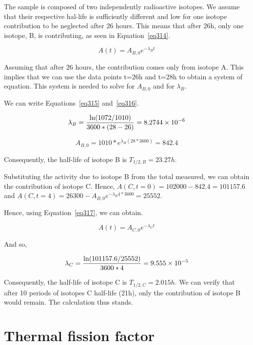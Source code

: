 The sample is composed of two independently radioactive isotopes. We assume that their respective hal-life is sufficiently different and low for one isotope contribution to be neglected after 26 hours. This means that after 26h, only one isotope, B, is contributing, as seen in Equation~\ref{eq314}.

\begin{equation}\label{eq314}
A(t) = A_{B, 0}e^{-\lambda_B t}
\end{equation}

Assuming that after 26 hours, the contribution comes only from isotope A. This implies that we can use the data points t=26h and t=28h to obtain a system of equation. This system is needed to solve for $A_{B, 0}$ and for $\lambda_B$.

We can write Equations~\ref{eq315} and~\ref{eq316}.


\begin{equation}\label{eq315}
\lambda_B = \frac{\ln(1072/1010)}{3600 * (28-26)} = \text{\num{8.2744e-6}}
\end{equation}

\begin{equation}\label{eq316}
A_{B,0} = 1010 * e^{\lambda_B (28*3600)} = 842.4
\end{equation}

Consequently, the half-life of isotope B is $T_{1/2, B} = 23.27h$.

Substituting the activity due to isotope B from the total measured, we can obtain the contribution of isotope C. Hence, $A(C, t=0) = 102000-842.4 = 101157.6$ and $A(C, t=4) = 26300 - A_{B, 0}e^{-\lambda_B 4*3600} = 25552$.

Hence, using Equation~\ref{eq317}, we can obtain.


\begin{equation}\label{eq317}
A(t) = A_{C, 0}e^{-\lambda_C t}
\end{equation}

And so,

\begin{equation}\label{eq318}
\lambda_C = \frac{\ln(101157.6/25552)}{3600 * 4} = \text{\num{9.555e-5}}
\end{equation}


Consequently, the half-life of isotope C is $T_{1/2, C} = 2.015h$. We can verify that after 10 periods of isotopes C half-life (21h), only the contribution of isotope B would remain. The calculation thus stands.

\section{Thermal fission factor}
\label{prob33}


